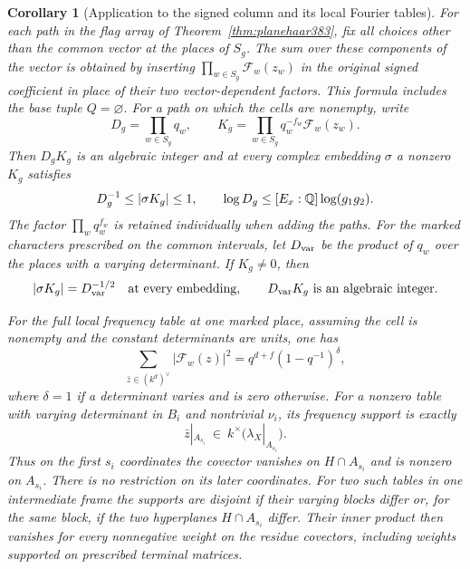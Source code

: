 \documentclass[a4paper,11pt]{article}
\newtheorem{corollary}[proposition]{Corollary}
\theoremstyle{definition}
\theoremstyle{remark}
\numberwithin{equation}{section}
\begin{document}
\begin{corollary}[Application to the signed column and its local Fourier tables]
\label{cor:coupledglobal386}
For each path in the flag array of Theorem~\ref{thm:planehaar383},
fix all choices other than the common vector at the places of
\(S_g\). The sum over these components of the vector is obtained
by inserting \(\prod_{w\in S_g}\mathcal F_w(z_w)\) in the
original signed coefficient in place of their two
vector-dependent factors. This formula includes the base
tuple \(Q=\varnothing\). For a path on which the cells are
nonempty, write
\[
     D_g=\prod_{w\in S_g}q_w,\qquad
     K_g=\prod_{w\in S_g}q_w^{-f_w}\mathcal F_w(z_w).
\]
Then \(D_g K_g\) is an algebraic integer and at every complex
embedding \(\sigma\) a nonzero \(K_g\) satisfies
\[
                 D_g^{-1}\le |\sigma K_g|\le1,\qquad
                 \log D_g\le [E_x:\mathbb Q]\log(g_1g_2).
\]
The factor \(\prod_w q_w^{f_w}\) is retained individually
when adding the paths.
For the marked characters prescribed on the common intervals,
let \(D_{\rm var}\) be the product of \(q_w\) over the places
with a varying determinant. If \(K_g\ne0\), then
\[
       |\sigma K_g|=D_{\rm var}^{-1/2}
       \quad\text{at every embedding},\qquad
       D_{\rm var}K_g\ \text{is an algebraic integer}.
\]

For the full local frequency table at one marked place, assuming
the cell is nonempty and the constant determinants are units, one has
\[
   \sum_{\bar z\in(k^d)^\vee}|\mathcal F_w(z)|^2
       =q^{d+f}(1-q^{-1})^\delta ,
\]
where \(\delta=1\) if a determinant varies and is zero otherwise.
For a nonzero table with varying determinant in \(B_i\) and
nontrivial \(\nu_i\), its frequency support is exactly
\[
       \bar z|_{A_{s_i}}\ \in\ k^\times
                    \bigl(\lambda_X|_{A_{s_i}}\bigr).
\]
Thus on the first \(s_i\) coordinates the covector vanishes
on \(H\cap A_{s_i}\) and is nonzero on \(A_{s_i}\). There
is no restriction on its later coordinates. For two such
tables in one intermediate frame the supports are disjoint
if their varying blocks differ or, for the same block, if the
two hyperplanes \(H\cap A_{s_i}\) differ. Their inner product
then vanishes for every nonnegative weight on the residue
covectors, including weights supported on prescribed
terminal matrices.
\end{corollary}
\end{document}
